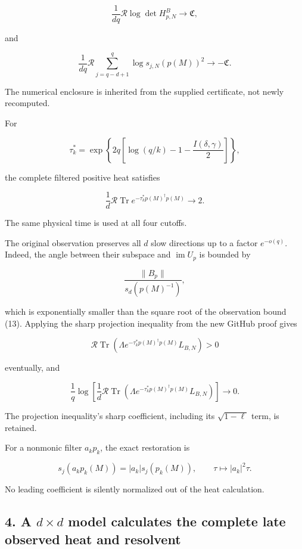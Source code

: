 \documentclass[11pt]{article}
\begin{document}
\[
\boxed{
\frac1{dq}\mathcal R\log\det H^B_{p,N}
\longrightarrow\mathfrak C,
}
\tag{28}
\]

and

\[
\boxed{
\frac1{dq}\mathcal R
\sum_{j=q-d+1}^{q}
\log s_{j,N}(p(M))^2
\longrightarrow-\mathfrak C.
}
\tag{29}
\]

The numerical enclosure is inherited from the supplied certificate, not newly recomputed.

For

\[
\tau_k^*
=
\exp\left\{
2q\left[\log(q/k)-1-\frac{I(\delta,\gamma)}2\right]
\right\},
\]

the complete filtered positive heat satisfies

\[
\boxed{
\frac1d\mathcal R
\operatorname{Tr}
e^{-\tau_k^*p(M)^\dagger p(M)}
\longrightarrow2.
}
\tag{30}
\]

The same physical time is used at all four cutoffs.

The original observation preserves all \(d\) slow directions up to a factor \(e^{-o(q)}\). Indeed, the angle between their subspace and \(\operatorname{im}U_p\) is bounded by

\[
\frac{\|B_p\|}{s_d(p(M)^{-1})},
\]

which is exponentially smaller than the square root of the observation bound (13). Applying the sharp projection inequality from the new GitHub proof gives

\[
\boxed{
\mathcal R\operatorname{Tr}
\left(
\Lambda e^{-\tau_k^*p(M)^\dagger p(M)}L_{B,N}
\right)>0
}
\tag{31}
\]

eventually, and

\[
\boxed{
\frac1q\log\left[
\frac1d\mathcal R\operatorname{Tr}
\left(
\Lambda e^{-\tau_k^*p(M)^\dagger p(M)}L_{B,N}
\right)
\right]\longrightarrow0.
}
\tag{32}
\]

The projection inequality's sharp coefficient, including its \(\sqrt{1-\ell}\) term, is retained.

For a nonmonic filter \(a_kp_k\), the exact restoration is

\[
s_j(a_kp_k(M))=|a_k|s_j(p_k(M)),
\qquad
\tau\mapsto |a_k|^2\tau.
\]

No leading coefficient is silently normalized out of the heat calculation.

\subsection{\texorpdfstring{4. A \(d\times d\) model calculates the complete late observed heat and resolvent}{4. A d\textbackslash times d model calculates the complete late observed heat and resolvent}}\label{a-dtimes-d-model-calculates-the-complete-late-observed-heat-and-resolvent}
\end{document}
